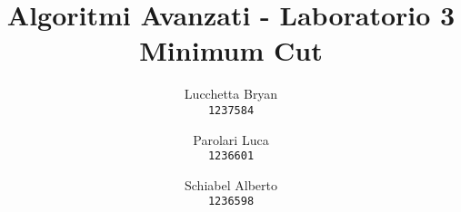 \author{
  Lucchetta Bryan\\
  \texttt{1237584}
  \and
  Parolari Luca\\
  \texttt{1236601}
  \and
  Schiabel Alberto\\
  \texttt{1236598}
}

\title{Algoritmi Avanzati - Laboratorio 3 \\
  \large Minimum Cut}

\maketitle

\setcounter{tocdepth}{2}
{
  \hypersetup{linkcolor=black}
  \tableofcontents
  \newpage
  \listoffigures
  \listoftables
}
\protect\pagebreak[2]

